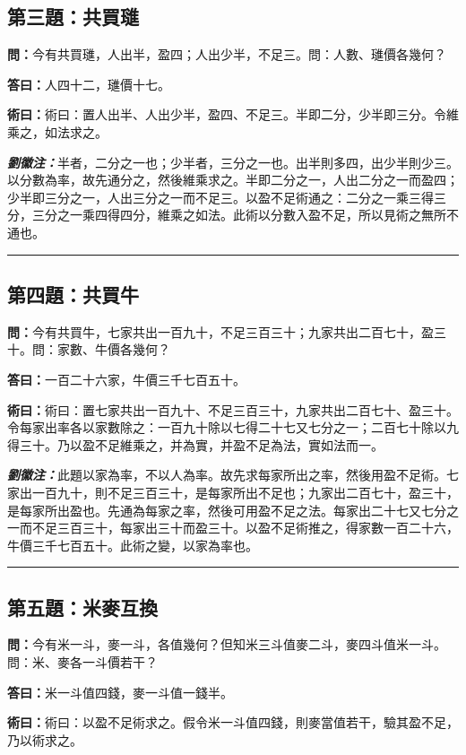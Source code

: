 \documentclass[11pt,a4paper]{article}
\newcommand{\wen}[1]{\textbf{\color{problemcolor}問：}#1\par}
\newcommand{\da}[1]{\textbf{答曰：}#1\par}
\newcommand{\shu}[1]{\textbf{術曰：}#1\par}
\newcommand{\liuhui}[1]{{\color{commentarycolor}\textit{\textbf{劉徽注：}}#1\par}}
\begin{document}
\subsection{第三題：共買璡}

\wen{今有共買璡，人出半，盈四；人出少半，不足三。問：人數、璡價各幾何？}

\da{人四十二，璡價十七。}

\shu{術曰：置人出半、人出少半，盈四、不足三。半即二分，少半即三分。令維乘之，如法求之。}

\liuhui{半者，二分之一也；少半者，三分之一也。出半則多四，出少半則少三。以分數為率，故先通分之，然後維乘求之。半即二分之一，人出二分之一而盈四；少半即三分之一，人出三分之一而不足三。以盈不足術通之：二分之一乘三得三分，三分之一乘四得四分，維乘之如法。此術以分數入盈不足，所以見術之無所不通也。}

\bigskip
\hrule
\bigskip

\subsection{第四題：共買牛}

\wen{今有共買牛，七家共出一百九十，不足三百三十；九家共出二百七十，盈三十。問：家數、牛價各幾何？}

\da{一百二十六家，牛價三千七百五十。}

\shu{術曰：置七家共出一百九十、不足三百三十，九家共出二百七十、盈三十。令每家出率各以家數除之：一百九十除以七得二十七又七分之一；二百七十除以九得三十。乃以盈不足維乘之，并為實，并盈不足為法，實如法而一。}

\liuhui{此題以家為率，不以人為率。故先求每家所出之率，然後用盈不足術。七家出一百九十，則不足三百三十，是每家所出不足也；九家出二百七十，盈三十，是每家所出盈也。先通為每家之率，然後可用盈不足之法。每家出二十七又七分之一而不足三百三十，每家出三十而盈三十。以盈不足術推之，得家數一百二十六，牛價三千七百五十。此術之變，以家為率也。}

\bigskip
\hrule
\bigskip

\subsection{第五題：米麥互換}

\wen{今有米一斗，麥一斗，各值幾何？但知米三斗值麥二斗，麥四斗值米一斗。問：米、麥各一斗價若干？}

\da{米一斗值四錢，麥一斗值一錢半。}

\shu{術曰：以盈不足術求之。假令米一斗值四錢，則麥當值若干，驗其盈不足，乃以術求之。}
\end{document}
